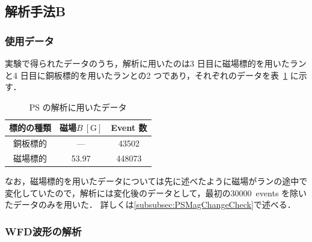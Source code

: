 

%

\subsection{解析手法B}
\label{subsec:PSAnalyses}

\subsubsection{使用データ}
\label{subsubsec:PSData}

実験で得られたデータのうち，解析に用いたのは3 日目に磁場標的を用いたランと4 日目に銅板標的を用いたランとの2 つであり，それぞれのデータを表~\ref{tab:PSdata} に示す．
\begin{table}[h]
	\centering
	\caption{PS の解析に用いたデータ}
	\begin{tabular}{ccc} \toprule
	標的の種類 & 磁場$B~[\mathrm{G}]$ & Event 数 \\ \midrule
	銅板標的 & --- & 43502 \\
	磁場標的 & 53.97 & 448073 \\ \bottomrule
	\end{tabular}\label{tab:PSdata}
\end{table}%

なお，磁場標的を用いたデータについては先に述べたように磁場がランの途中で変化していたので，解析には変化後のデータとして，最初の30000~events を除いたデータのみを用いた．
詳しくは\ref{subsubsec:PSMagChangeCheck}で述べる．

\subsubsection{WFD波形の解析}
\label{subsubsec:PSEventDisplay}

